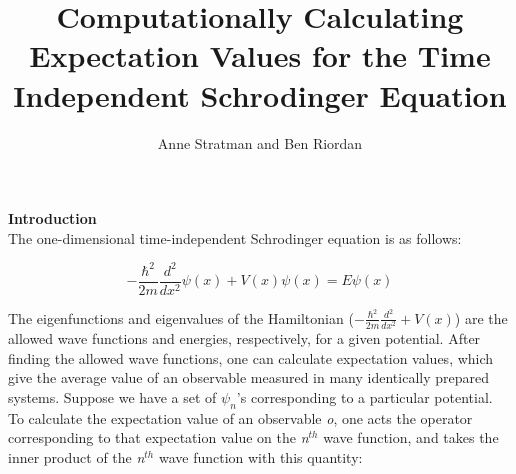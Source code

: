 \documentclass[%
 reprint,
 amsmath,amssymb,
 aps,
]{revtex4-1}
\begin{document}



\title{Computationally Calculating Expectation Values for the Time Independent Schrodinger Equation}

\author{Anne Stratman and Ben Riordan}
%

\maketitle								%





\noindent \textbf{Introduction}\\

The one-dimensional time-independent Schrodinger equation is as follows:

\begin{equation}
-\frac{\hbar^2}{2m}\frac{d^2}{dx^2}\psi(x)+V(x)\psi(x)=E\psi(x)
\end{equation}

The eigenfunctions and eigenvalues of the Hamiltonian ($-\frac{\hbar^2}{2m}\frac{d^2}{dx^2}+V(x)$) are the allowed wave functions and energies, respectively, for a given potential.  After finding the allowed wave functions, one can calculate expectation values, which give the average value of an observable measured in many identically prepared systems.  Suppose we have a set of $\psi_n$'s corresponding to a particular potential.  To calculate the expectation value of an observable \textit{o}, one acts the operator corresponding to that expectation value on the \textit{n}$^{th}$ wave function, and takes the inner product of the \textit{n}$^{th}$ wave function with this quantity:
\end{document}
